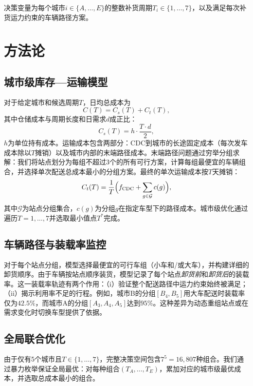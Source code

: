 \documentclass[10pt]{ctexart}
\begin{document}
决策变量为每个城市$i \in \{A,\dots,E\}$的整数补货周期$T_i \in \{1,\dots,7\}$，以及满足每次补货运力约束的车辆路径方案。

\section{方法论}
\subsection{城市级库存—运输模型}
对于给定城市和候选周期$T$，日均总成本为
\begin{equation}
    C(T) = C_s(T) + C_t(T),
\end{equation}
其中仓储成本与周期长度和日需求$d$成正比：
\begin{equation}
    C_s(T) = h \cdot \frac{T \cdot d}{2},
\end{equation}
$h$为单位持有成本。运输成本包含两部分：CDC到城市的长途固定成本（每次发车成本除以$T$摊销）以及城市内部的末端路径成本。末端路径问题通过穷举分组求解：我们将站点划分为每组不超过3个的所有可行方案，计算每组最便宜的车辆组合，并选择单次配送总成本最小的分组方案。最终的单次运输成本按$T$天摊销：
\begin{equation}
    C_t(T) = \frac{1}{T}\Bigl(f_{\text{CDC}} + \sum_{g \in \mathcal{G}} c(g)\Bigr),
\end{equation}
其中$\mathcal{G}$为站点分组集合，$c(g)$为分组$g$在指定车型下的路径成本。城市级优化通过遍历$T=1,\dots,7$并选取最小值点$T^*$完成。

\subsection{车辆路径与装载率监控}
对于每个站点分组，模型选择最便宜的可行车组（小车和/或大车），并构建详细的卸货顺序。由于车辆按站点顺序装货，模型记录了每个站点\emph{卸货前}和\emph{卸货后}的装载率。这一装载率轨迹有两个作用：（i）验证整个配送路径中运力约束始终被满足；（ii）揭示利用率不足的行程。例如，城市B的分组$[B_4,B_5]$用大车配送时装载率仅为$42.5\%$，而城市A的分组$[A_3,A_4,A_5]$达到$95\%$。这种差异为动态重组站点或在需求变化时切换车型提供了依据。

\subsection{全局联合优化}
由于仅有5个城市且$T \in \{1,\dots,7\}$，完整决策空间包含$7^5 = 16{,}807$种组合。我们通过暴力枚举保证全局最优：对每种组合$(T_A,\dots,T_E)$，累加对应的城市级最优成本，并选取总成本最小的组合。
\end{document}
